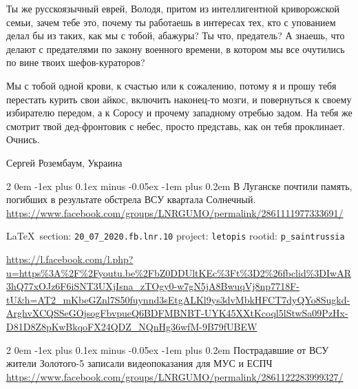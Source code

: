 \documentclass[a4paper,11pt]{extreport}
\makeatletter
\renewcommand\subsection{%
  \clearpage
    \@startsection{subsection}%
    {2}%
    {0em}%
    {-1ex plus 0.1ex minus -0.05ex}%
    {-1em plus 0.2em}%
    {\scshape\bfseries\Large}%
}
\makeatother
\begin{document}
Ты же русскоязычный еврей, Володя, притом из интеллигентной криворожской семьи,
зачем тебе это, почему ты работаешь в интересах тех, кто с упованием делал бы
из таких, как мы с тобой, абажуры? Ты что, предатель? А знаешь, что делают с
предателями по закону военного времени, в котором мы все очутились по вине
твоих шефов-кураторов?

Мы с тобой одной крови, к счастью или к сожалению, потому я и прошу тебя
перестать курить свои айкос, включить наконец-то мозги, и повернуться к своему
избирателю передом, а к Соросу и прочему западному отребью задом. На тебя же
смотрит твой дед-фронтовик с небес, просто представь, как он тебя проклинает.
Очнись.

Сергей Розембаум, Украина
  
 
 

\subsection{В Луганске почтили память, погибших в результате обстрела ВСУ квартала Солнечный.}
\label{sec:20_07_2020.fb.lnr.10}
\url{https://www.facebook.com/groups/LNRGUMO/permalink/2861111977333691/}
  
\vspace{0.5cm}
{\small\LaTeX~section: \verb|20_07_2020.fb.lnr.10| project: \verb|letopis| rootid: \verb|p_saintrussia|}
\vspace{0.5cm}

\url{https://l.facebook.com/l.php?u=https%3A%2F%2Fyoutu.be%2FbZ0DDUltKEc%3Ft%3D2%26fbclid%3DIwAR3hQ77xOJz6F6iSNT3UXjIsna_zTOgy0-w7gN5jA8BwuqVj8np7718F-tU&h=AT2_mKbeGZnl7S50fuynnd3sEtgALKl9ys3dvMbkHFCT7dyQYo8Sugkd-ArghvXCQSSeGOjsogFbvpueQ6BDFMBNBT-UYK45XXtKcoql5lStwSa09PzHx-D81D8Z8pKwBkqoFX24QDZ_NQnHg36wfM-9B79fUBEW}
  
 
 

\subsection{Пострадавшие от ВСУ жители Золотого-5 записали видеопоказания для МУС и ЕСПЧ }
\label{sec:20_07_2020.fb.lnr.11}
\url{https://www.facebook.com/groups/LNRGUMO/permalink/2861122283999327/}
  
\end{document}
